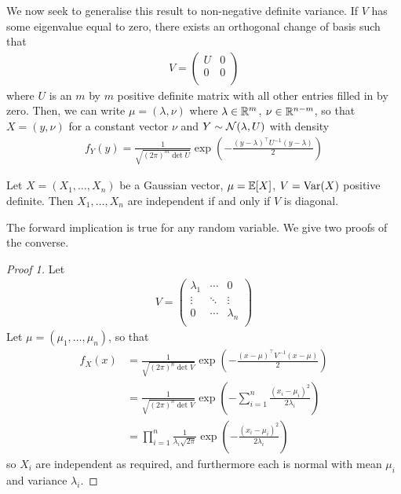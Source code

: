 \documentclass{../../template/note}
\begin{document}
    We now seek to generalise this result to non-negative definite variance. If \(V\) has some eigenvalue equal to zero, there exists an orthogonal change of basis such that
    \begin{align*}
        V = \begin{pmatrix}
            U & 0 \\
            0 & 0 \\
        \end{pmatrix}
    \end{align*}
    where \(U\) is an \(m\) by \(m\) positive definite matrix with all other entries filled in by zero. Then, we can write \(\mu = (\lambda, \nu)\) where \(\lambda \in \mathbb R^m\), \(\nu \in \mathbb R^{n-m}\), so that \(X = (y, \nu)\) for a constant vector \(\nu\) and \(Y \sim \mathcal{N}(\lambda, U)\) with density
    \begin{align*}
        f_Y(y) = \frac 1{\sqrt{(2\pi)^m \det U}} \exp\left(-\frac{(y-\lambda)^\intercal U^{-1} (y-\lambda)} 2\right)
    \end{align*}
    
    \begin{proposition}
        Let \(X = (X_1, \dots, X_n)\) be a Gaussian vector, \(\mu = \mathbb E[X]\), \(V = \operatorname{Var}(X)\) positive definite. Then \(X_1, \dots, X_n\) are independent if and only if \(V\) is diagonal.
    \end{proposition}
    
    The forward implication is true for any random variable. We give two proofs of the converse.

    \begin{proof}[Proof 1]
        Let
        \begin{align*}
            V = \begin{pmatrix}
                \lambda_1 & \cdots & 0 \\
                \vdots & \ddots & \vdots \\
                0 & \cdots & \lambda_n \\
            \end{pmatrix}
        \end{align*}
        Let \(\mu = (\mu_1, \dots, \mu_n)\), so that
        \begin{align*}
            f_X(x) &= \frac 1{\sqrt{(2\pi)^n \det V}} \exp\left(-\frac{(x-\mu)^\intercal V^{-1} (x-\mu)}{2}\right) \\
            &= \frac 1{\sqrt{(2\pi)^n \det V}} \exp\left(-\sum_{i=1}^n \frac{(x_i-\mu_i)^2}{2\lambda_i}\right) \\
            &= \prod_{i=1}^n \frac 1 {\lambda_i \sqrt{2\pi}} \exp\left(-\frac{(x_i-\mu_i)^2}{2\lambda_i}\right)
        \end{align*}
        so \(X_i\) are independent as required, and furthermore each is normal with mean \(\mu_i\) and variance \(\lambda_i\).
    \end{proof}
    
\end{document}
